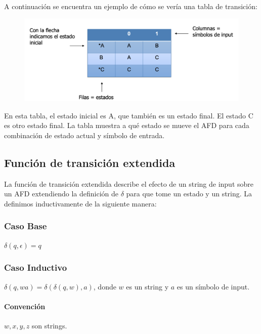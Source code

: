 \documentclass[11pt]{article}
\begin{document}
    A continuación se encuentra un ejemplo de cómo se vería una tabla de transición:

    \begin{figure}
        \centering
        \includegraphics[width=\textwidth]{img/afd/afd-5}\label{fig:figure5}
    \end{figure}

    En esta tabla, el estado inicial es A, que también es un estado final. El estado C es otro estado final. La tabla muestra a qué estado se mueve el AFD para cada combinación de estado actual y símbolo de entrada.

    \subsection{Función de transición extendida}

    La función de transición extendida describe el efecto de un string de input sobre un AFD extendiendo la definición de $\delta$ para que tome un estado y un string. La definimos inductivamente de la siguiente manera:

    \subsubsection{Caso Base}

    $\delta(q, \epsilon) = q$

    \subsubsection{Caso Inductivo}

    $\delta(q, wa) = \delta(\delta(q, w), a)$, donde $w$ es un string y $a$ es un símbolo de input.

    \paragraph{Convención}

    $w, x, y, z$ son strings.
\end{document}
